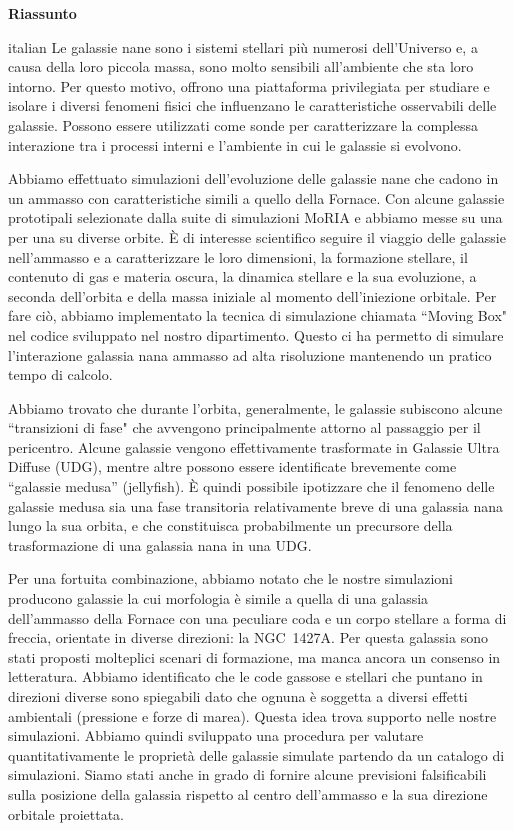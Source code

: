 \clearpage
\thispagestyle{empty}
\null%
\begin{center}
  {\Large \textbf{Riassunto}}\\
\end{center}
\begin{otherlanguage*}{italian}
Le galassie nane sono i sistemi stellari più numerosi dell'Universo e, a causa della loro piccola massa, sono molto sensibili all'ambiente che sta loro intorno.
Per questo motivo, offrono una piattaforma privilegiata per studiare e isolare i diversi fenomeni fisici che influenzano le caratteristiche osservabili delle galassie.
Possono essere utilizzati come sonde per caratterizzare la complessa interazione tra i processi interni e l'ambiente in cui le galassie si evolvono.

Abbiamo effettuato simulazioni dell'evoluzione delle galassie nane che cadono in un ammasso con caratteristiche simili a quello della Fornace.
Con alcune galassie prototipali selezionate dalla suite di simulazioni MoRIA e abbiamo messe su una per una su diverse orbite.
È di interesse scientifico seguire il viaggio delle galassie nell'ammasso e a caratterizzare le loro dimensioni, la formazione stellare, il contenuto di gas e materia oscura, la dinamica stellare e la sua evoluzione, a seconda dell'orbita e della massa iniziale al momento dell'iniezione orbitale.
Per fare ciò, abbiamo implementato la tecnica di simulazione chiamata ``Moving Box" nel codice sviluppato nel nostro dipartimento.
Questo ci ha permetto di simulare l'interazione galassia nana ammasso ad alta risoluzione mantenendo un pratico tempo di calcolo.

Abbiamo trovato che durante l'orbita, generalmente, le galassie subiscono alcune ``transizioni di fase" che avvengono principalmente attorno al passaggio per il pericentro.
Alcune galassie vengono effettivamente trasformate in Galassie Ultra Diffuse (UDG), mentre altre possono essere identificate brevemente come ``galassie medusa'' (jellyfish).
È quindi possibile ipotizzare che il fenomeno delle galassie medusa sia una fase transitoria relativamente breve di una galassia nana lungo la sua orbita, e che constituisca probabilmente un precursore della trasformazione di una galassia nana in una UDG.

Per una fortuita combinazione, abbiamo notato che le nostre simulazioni producono galassie la cui morfologia è simile a quella di una galassia dell'ammasso della Fornace con una peculiare coda \Hi{} e un corpo stellare a forma di freccia, orientate in diverse direzioni: la NGC~1427A.
Per questa galassia sono stati proposti molteplici scenari di formazione, ma manca ancora un consenso in letteratura.
Abbiamo identificato che le code gassose e stellari che puntano in direzioni diverse sono spiegabili dato che ognuna è soggetta a diversi effetti ambientali (pressione e forze di marea).
Questa idea trova supporto nelle nostre simulazioni.
Abbiamo quindi sviluppato una procedura per valutare quantitativamente le proprietà delle galassie simulate partendo da un catalogo di simulazioni.
Siamo stati anche in grado di fornire alcune previsioni falsificabili sulla posizione della galassia rispetto al centro dell'ammasso e la sua direzione orbitale proiettata.


\end{otherlanguage*}
